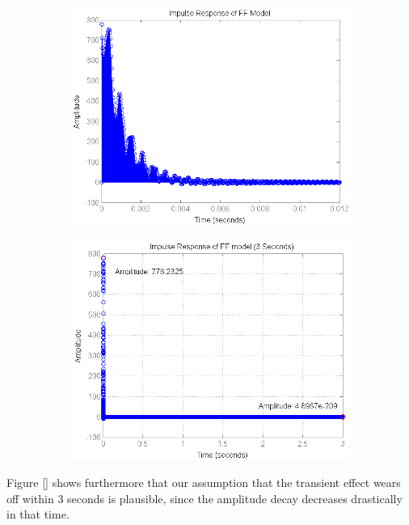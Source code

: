 \begin{figure}[H]
\centering
\begin{subfigure}[b]{0.5\textwidth}
\includegraphics[width=1.0\textwidth]{pics/impulse_FF}
\caption{}
\label{pic:}
\end{subfigure}\;\begin{subfigure}[b]{0.5\textwidth}
\includegraphics[width=1.0\textwidth]{pics/impulse_FF_3sec}
\caption{}
\label{pic:}
\end{subfigure}

\end{figure}

Figure \ref{} shows furthermore that our assumption that the transient effect wears off within 3 seconds is plausible, since the amplitude decay decreases drastically in that time.

